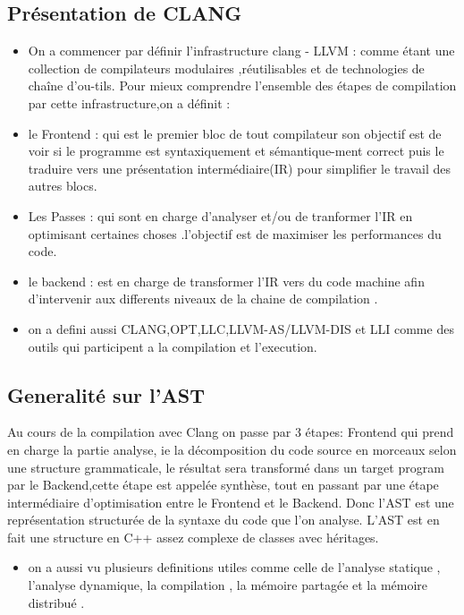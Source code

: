 \documentclass[12pt,titlepage]{article}
\begin{document}
\subsection{Présentation de CLANG \cite{clangllvm}  }

\begin{itemize}
    \item On a commencer par définir l'infrastructure clang - LLVM : comme étant une collection de compilateurs modulaires ,réutilisables et de technologies de chaîne d’ou-tils. Pour mieux comprendre l’ensemble des étapes de compilation par cette infrastructure,on a définit :
    \item le Frontend : qui est le premier bloc de tout compilateur son objectif est de voir si le programme est syntaxiquement et sémantique-ment correct puis le traduire vers une présentation intermédiaire(IR) pour simplifier le travail des autres blocs.
    \item Les Passes : qui sont en charge d'analyser et/ou de tranformer l'IR en optimisant certaines choses .l'objectif est de maximiser les performances du code.
    \item le backend : est en charge de transformer l'IR vers du code machine afin d'intervenir aux differents niveaux de la chaine de compilation .
    \item on a defini aussi CLANG,OPT,LLC,LLVM-AS/LLVM-DIS et LLI comme des outils qui participent a la compilation et l'execution.
\end{itemize}


\subsection{Generalité sur l'AST}

Au cours de la compilation avec Clang on passe par 3 étapes: Frontend qui prend en charge la partie analyse, ie la décomposition du code source en morceaux selon une structure grammaticale, le résultat sera transformé  dans un target program par le Backend,cette étape est appelée synthèse, tout en passant par une étape intermédiaire d'optimisation entre le Frontend et le Backend.\cite{Devlieghere} Donc l’AST est une représentation structurée de la syntaxe du code que l’on analyse. L’AST est en fait une structure en C++ assez complexe de classes avec héritages.

\begin{itemize}
    \item on a aussi vu plusieurs definitions utiles comme celle de l'analyse statique , l'analyse dynamique, la compilation , la mémoire partagée et la mémoire distribué .
\end{itemize}
\end{document}
